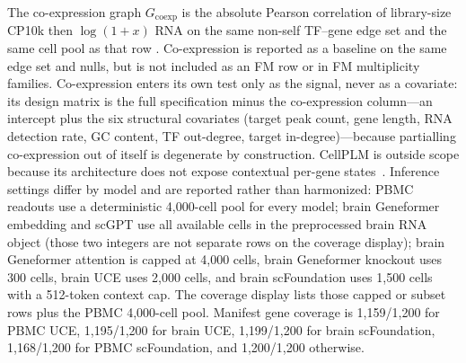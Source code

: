 \documentclass[fleqn,10pt,lineno]{wlpeerj}
\begin{document}
The co-expression graph $G_{\mathrm{coexp}}$ is the absolute Pearson correlation of
library-size CP10k then $\log(1+x)$ RNA on the same non-self TF--gene edge set and the same cell
pool as that row \citep{pratapa2020benchmarking}.
Co-expression is reported as a baseline on the same edge set and nulls, but is not included as an
FM row or in FM multiplicity families. Co-expression enters its own test only as the signal,
never as a covariate: its design matrix is the full specification minus the
co-expression column---an intercept plus the six structural covariates (target peak count, gene
length, RNA detection rate, GC content, TF out-degree, target in-degree)---because partialling
co-expression out of itself is degenerate by construction. CellPLM is outside scope because its
architecture does not
expose contextual per-gene states~\citep{wen2024cellplm}. Inference settings differ by model and
are reported rather than harmonized: PBMC readouts use a deterministic 4,000-cell pool for every
model; brain Geneformer embedding and scGPT use all available cells in the preprocessed brain RNA
object (those two integers are not separate rows on the coverage display); brain Geneformer
attention is capped at 4,000 cells, brain Geneformer knockout uses 300 cells, brain UCE uses 2,000
cells, and brain scFoundation uses 1,500 cells with a 512-token context cap. The coverage display
lists those capped or subset rows plus the PBMC 4,000-cell pool. Manifest gene coverage is 1,159/1,200 for PBMC UCE, 1,195/1,200 for brain
UCE, 1,199/1,200 for brain scFoundation, 1,168/1,200 for PBMC scFoundation, and 1,200/1,200
otherwise.
\end{document}

